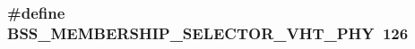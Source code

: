 \subsubsection[{\texorpdfstring{B\+S\+S\+\_\+\+M\+E\+M\+B\+E\+R\+S\+H\+I\+P\+\_\+\+S\+E\+L\+E\+C\+T\+O\+R\+\_\+\+V\+H\+T\+\_\+\+P\+HY}{BSS_MEMBERSHIP_SELECTOR_VHT_PHY}}]{\setlength{\rightskip}{0pt plus 5cm}\#define B\+S\+S\+\_\+\+M\+E\+M\+B\+E\+R\+S\+H\+I\+P\+\_\+\+S\+E\+L\+E\+C\+T\+O\+R\+\_\+\+V\+H\+T\+\_\+\+P\+HY~126}\hypertarget{supported-rates_8cc_acb3ac24cdcc68c1a711dee3fcca1227d}{}\label{supported-rates_8cc_acb3ac24cdcc68c1a711dee3fcca1227d}
